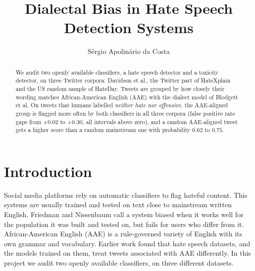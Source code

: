 \documentclass[runningheads,a4paper,oribibl]{llncs}
\begin{document}
\pagestyle{headings}

\mainmatter

\title{Dialectal Bias in Hate Speech Detection Systems}

\author{S\'{e}rgio Apolin\'{a}rio da Costa}


\maketitle

\begin{abstract}
We audit two openly available classifiers, a hate speech detector and a toxicity detector, on
three Twitter corpora: Davidson et al., the Twitter part of HateXplain and the US random sample
of HateDay. Tweets are grouped by how closely their wording matches African-American English
(AAE) with the dialect model of Blodgett et al. On tweets that humans labelled 
\emph{neither hate nor offensive}, the AAE-aligned group is flagged more often by both classifiers
in all three corpora (false positive rate gaps from $+0.02$ to $+0.30$, all intervals above 
zero), and a random AAE-aligned tweet gets a higher score than a random mainstream one with
probability $0.62$ to $0.75$.
\end{abstract}

\section{Introduction}
Social media platforms rely on automatic classifiers to flag hateful content. This systems are
usually trained and tested on text close to mainstream written English. Friedman and Nissenbaum
call a system biased when it works well for the population it was built and tested on, but fails
for users who differ from it. African-American English (AAE) is a rule-governed variety of English
with its own grammar and vocabulary. Earlier work found that hate speech datasets, and the models
trained on them, treat tweets associated with AAE differently. In this project we audit two
openly available classifiers, on three different datasets.
\end{document}
